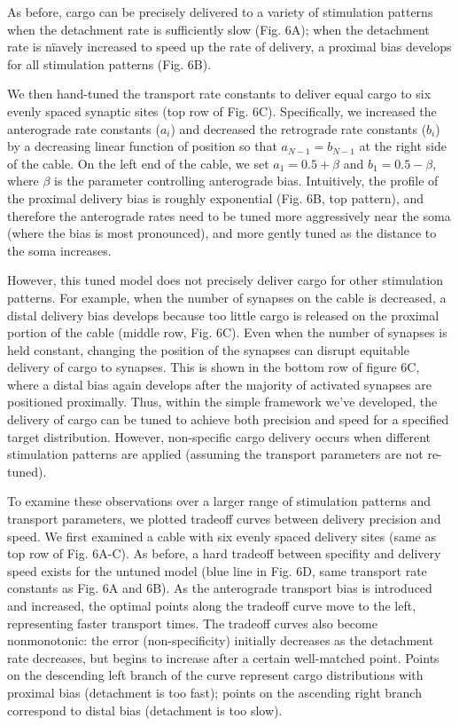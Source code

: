 \documentclass[11pt]{wlpeerj}
\begin{document}
As before, cargo can be precisely delivered to a variety of stimulation patterns when the detachment rate is sufficiently slow (Fig. 6A); when the detachment rate is n\"iavely increased to speed up the rate of delivery, a proximal bias develops for all stimulation patterns (Fig. 6B).

We then hand-tuned the transport rate constants to deliver equal cargo to six evenly spaced synaptic sites (top row of Fig. 6C).
Specifically, we increased the anterograde rate constants ($a_i$) and decreased the retrograde rate constants ($b_i$) by a decreasing linear function of position so that $a_{N-1} = b_{N-1}$ at the right side of the cable.
On the left end of the cable, we set $a_1 = 0.5 + \beta$ and $b_1 = 0.5 - \beta$, where $\beta$ is the parameter controlling anterograde bias.
Intuitively, the profile of the proximal delivery bias is roughly exponential (Fig. 6B, top pattern), and therefore the anterograde rates need to be tuned more aggressively near the soma (where the bias is most pronounced), and more gently tuned as the distance to the soma increases.

However, this tuned model does not precisely deliver cargo for other stimulation patterns.
For example, when the number of synapses on the cable is decreased, a distal delivery bias develops because too little cargo is released on the proximal portion of the cable (middle row, Fig. 6C).
Even when the number of synapses is held constant, changing the position of the synapses can disrupt equitable delivery of cargo to synapses. This is shown in the bottom row of figure 6C, where a distal bias again develops after the majority of activated synapses are positioned proximally.
Thus, within the simple framework we've developed, the delivery of cargo can be tuned to achieve both precision and speed for a specified target distribution.
However, non-specific cargo delivery occurs when different stimulation patterns are applied (assuming the transport parameters are not re-tuned).

To examine these observations over a larger range of stimulation patterns and transport parameters, we plotted tradeoff curves between delivery precision and speed.
We first examined a cable with six evenly spaced delivery sites (same as top row of Fig. 6A-C).
As before, a hard tradeoff between specifity and delivery speed exists for the untuned model (blue line in Fig. 6D, same transport rate constants as Fig. 6A and 6B).
As the anterograde transport bias is introduced and increased, the optimal points along the tradeoff curve move to the left, representing faster transport times.
The tradeoff curves also become nonmonotonic: the error (non-specificity) initially decreases as the detachment rate decreases, but begins to increase after a certain well-matched point.
Points on the descending left branch of the curve represent cargo distributions with proximal bias (detachment is too fast); points on the ascending right branch correspond to distal bias (detachment is too slow).
\end{document}
